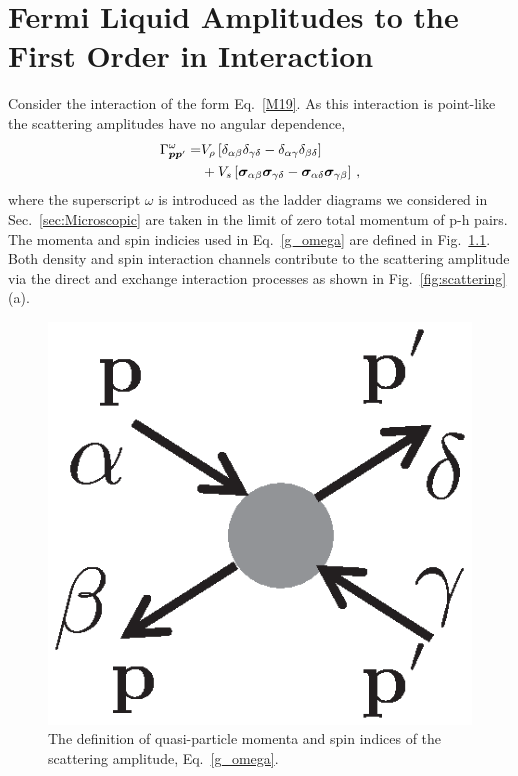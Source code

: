 



\chapter{Fermi Liquid Amplitudes to the First Order in Interaction}
\label{app:Fermi}
\setcounter{equation}{0}
Consider the interaction of the form Eq.~\eqref{M19}.
As this interaction is point-like the scattering amplitudes have no angular dependence,
\begin{align}\label{g_omega}
\Gamma^{\omega}_{\vec{p}\vec{p}'} = &  V_{\rho} \left[  \delta_{\alpha \beta} \delta_{\gamma \delta} - \delta_{\alpha\gamma} \delta_{\beta\delta} \right]
\notag \\
& +
V_s \left[  \vec{\sigma}_{\alpha\beta} \vec{\sigma}_{\gamma\delta} 
- \vec{\sigma}_{\alpha\delta} \vec{\sigma}_{\gamma\beta} \right]\, ,
\end{align}
where the superscript $\omega$ is introduced as the ladder diagrams we considered in Sec.~\ref{sec:Microscopic} are taken in the limit of zero total momentum of p-h pairs.
The momenta and spin indicies used in Eq.~\eqref{g_omega} are defined in Fig.~\ref{fig:app_ampl}. 
Both density and spin interaction channels contribute to the scattering amplitude via the direct and exchange interaction processes as shown in Fig.~\ref{fig:scattering}(a).


\begin{figure}[h]
\begin{center}
\includegraphics[width=0.5\columnwidth]{fig7.eps}
\caption{The definition of quasi-particle momenta and spin indices of the scattering amplitude, Eq.~\ref{g_omega}.\cite{Iqbal}}
\label{fig:app_ampl}
\end{center}
\end{figure}

